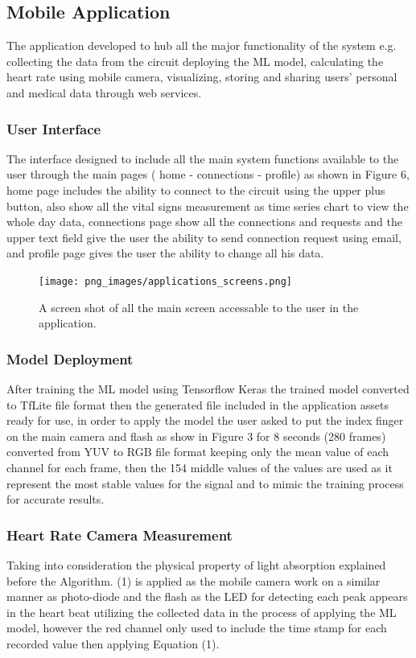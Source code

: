 \documentclass{bmcart}
\begin{document}

\subsection*{Mobile Application}
The application developed to hub all the major functionality of the system e.g.
collecting the data from the circuit deploying the ML model, calculating the
heart rate using mobile camera, visualizing, storing and sharing users' personal
and medical data through web services.
\subsubsection*{User Interface}
The interface designed to include all the main system functions available to the
user through the main pages ( home - connections - profile) as shown in Figure
6, home page includes the ability to connect to the circuit using the upper
plus button, also show all the vital signs measurement  as time series chart to
view the whole day  data, connections page show all the connections and requests
and the upper text field give the user the ability  to send connection request
using email, and profile page gives the user the ability to change all his data.
\begin{figure}[h!]
  \texttt{[image: png\_images/applications\_screens.png]}
  \caption{
  A screen shot of all the main screen accessable to the user in the
  application.}
\end{figure}
\FloatBarrier

\subsubsection*{Model Deployment}
After training the ML model using Tensorflow Keras the trained model converted
to TfLite file format then the generated file included in the application assets
ready for use, in order to apply the model the user asked to put the index
finger on the main camera and flash as show in Figure  3 for 8 seconds (280
frames) converted from YUV to RGB file format keeping only the mean value of
each channel for each frame, then the 154 middle values of the values are used
as it represent the most stable values for the signal and  to mimic the training
process for accurate results.

\subsubsection*{Heart Rate Camera Measurement}
Taking into consideration the physical property of light absorption explained
before the Algorithm. (1)  is applied as the mobile camera work on a similar
manner as photo-diode and the flash as the LED for detecting each peak appears
in the heart beat utilizing the collected data in the process of applying the ML
model, however the red channel only used to include the time stamp for each
recorded value then applying Equation (1). 
\end{document}
